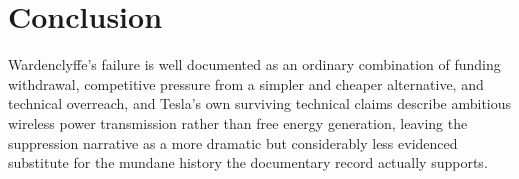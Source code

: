 \documentclass[11pt]{article}
\begin{document}
\section{Conclusion}

Wardenclyffe's failure is well documented as an ordinary combination of funding withdrawal, competitive pressure from a simpler and cheaper alternative, and technical overreach, and Tesla's own surviving technical claims describe ambitious wireless power transmission rather than free energy generation, leaving the suppression narrative as a more dramatic but considerably less evidenced substitute for the mundane history the documentary record actually supports.
\end{document}
